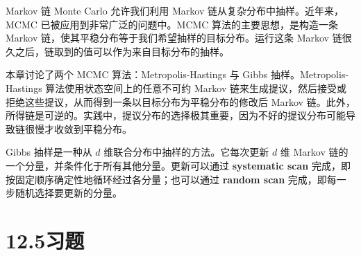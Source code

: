 \documentclass[UTF8, 12pt, fontset=fandol, oneside]{ctexart}
\begin{document}
Markov 链 Monte Carlo 允许我们利用 Markov 链从复杂分布中抽样。近年来，MCMC 已被应用到非常广泛的问题中。MCMC 算法的主要思想，是构造一条 Markov 链，使其平稳分布等于我们希望抽样的目标分布。运行这条 Markov 链很久之后，链取到的值可以作为来自目标分布的抽样。

本章讨论了两个 MCMC 算法：Metropolis-Hastings 与 Gibbs 抽样。Metropolis-Hastings 算法使用状态空间上的任意不可约 Markov 链来生成提议，然后接受或拒绝这些提议，从而得到一条以目标分布为平稳分布的修改后 Markov 链。此外，所得链是可逆的。实践中，提议分布的选择极其重要，因为不好的提议分布可能导致链很慢才收敛到平稳分布。

Gibbs 抽样是一种从 $d$ 维联合分布中抽样的方法。它每次更新 $d$ 维 Markov 链的一个分量，并条件化于所有其他分量。更新可以通过 \textbf{systematic scan} 完成，即按固定顺序确定性地循环经过各分量；也可以通过 \textbf{random scan} 完成，即每一步随机选择要更新的分量。

\section*{12.5\quad 习题}
\end{document}

